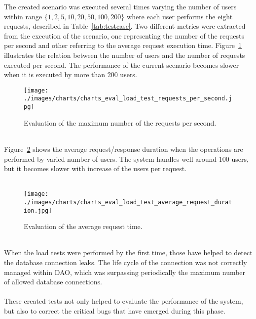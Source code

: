 The created scenario was executed several times varying the number of users within range $\{1, 2, 5, 10, 20, 50, 100, 200\}$ where each user performs the eight requests, described in Table~\ref{tab:testcase}. Two different metrics were extracted from the execution of the scenario, one representing the number of the requests per second and other referring to the average request execution time. Figure~\ref{fig:evalMaxRequests} illustrates the relation between the number of users and the number of requests executed per second. The performance of the current scenario becomes slower when it is executed by more than 200 users.\\
\begin{figure}[h!]
 \centering
   \texttt{[image: ./images/charts/charts\_eval\_load\_test\_requests\_per\_second.jpg]}
   \caption{Evaluation of the maximum number of the requests per second.}
   \label{fig:evalMaxRequests}
\end{figure}\\
Figure~\ref{fig:avgRequestTime} shows the average request/response duration  when the operations are performed by varied number of users. The system handles well around 100 users, but it becomes slower with increase of the users per request.\\\\
\begin{figure}[h!]
 \centering
   \texttt{[image: ./images/charts/charts\_eval\_load\_test\_average\_request\_duration.jpg]}
   \caption{Evaluation of the average request time.}
   \label{fig:avgRequestTime}
\end{figure}\\
When the load tests were performed by the first time, those have helped to detect the database connection leaks. The life cycle of the connection was not correctly managed within DAO, which was surpassing periodically the maximum number of allowed database connections.\\
\\
These created tests not only helped to evaluate the performance of the system, but also to correct the critical bugs that have emerged during this phase.

